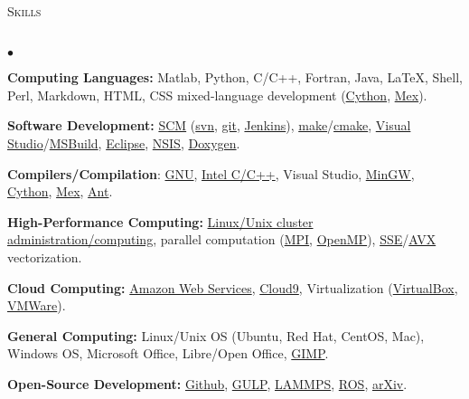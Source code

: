 \documentclass{article}
\newcommand{\lineunder}{\vspace*{-8pt} \\ \hspace*{-18pt} \hrulefill \\}
\newcommand{\header}[1]{{\hspace*{-15pt}\vspace*{6pt} \textsc{#1}} \vspace*{-6pt} \lineunder}
\newenvironment{achievements}{\begin{list}{$\bullet$}{\topsep 0pt \itemsep -2pt}}{\vspace*{4pt}\end{list}}
\begin{document}
\header{Skills}
\begin{achievements}

\item \textbf{Computing Languages:} Matlab, Python, C/C++, Fortran, Java, \LaTeX, Shell, Perl, Markdown, HTML, CSS mixed-language development (\href{http://cython.org/}{Cython}, \href{http://www.mathworks.com/help/matlab/ref/mex.html}{Mex}).

\item \textbf{Software Development:} \href{http://en.wikipedia.org/wiki/Software_configuration_management}{SCM} (\href{http://subversion.apache.org/}{svn}, \href{http://git-scm.com/}{git}, \href{http://jenkins-ci.org/}{Jenkins}), \href{http://www.gnu.org/software/make/}{make}/\href{http://www.cmake.org/}{cmake}, \href{http://www.visualstudio.com/}{Visual Studio}/\href{http://en.wikipedia.org/wiki/MSBuild}{MSBuild}, \href{http://www.eclipse.org/}{Eclipse}, \href{http://nsis.sourceforge.net/Main_Page}{NSIS}, \href{http://www.doxygen.org}{Doxygen}. 

\item \textbf{Compilers/Compilation}: \href{http://gcc.gnu.org/}{GNU}, \href{https://software.intel.com/en-us/c-compilers}{Intel C/C++}, Visual Studio, \href{http://www.mingw.org/}{MinGW}, \href{http://cython.org/}{Cython}, \href{http://www.mathworks.com/help/matlab/ref/mex.html}{Mex}, \href{http://ant.apache.org/}{Ant}.

\item \textbf{High-Performance Computing:} \href{http://en.wikipedia.org/wiki/Beowulf_cluster}{Linux/Unix cluster administration/computing}, parallel computation (\href{http://en.wikipedia.org/wiki/Message_Passing_Interface}{MPI}, \href{http://en.wikipedia.org/wiki/OpenMP}{OpenMP}), \href{http://en.wikipedia.org/wiki/Streaming_SIMD_Extensions}{SSE}/\href{http://en.wikipedia.org/wiki/Advanced_Vector_Extensions}{AVX} vectorization.

\item \textbf{Cloud Computing:} \href{http://aws.amazon.com/}{Amazon Web Services}, 
\href{https://c9.io/}{Cloud9}, Virtualization (\href{https://www.virtualbox.org/}{VirtualBox}, \href{http://www.vmware.com/}{VMWare}).

\item \textbf{General Computing:} Linux/Unix OS (Ubuntu, Red Hat, CentOS, Mac), Windows OS, Microsoft Office, Libre/Open Office, \href{http://www.gimp.org/}{GIMP}.

\item \textbf{Open-Source Development:} \href{http://github.com/jasonlarkin}{Github}, \href{http://projects.ivec.org/gulp/}{GULP}, \href{http://lammps.sandia.gov/}{LAMMPS}, \href{http://www.ros.org/}{ROS}, \href{http://arxiv.org/find/physics/1/au:+Larkin_J/0/1/0/all/0/1}{arXiv}.


\end{achievements}
\end{document}
